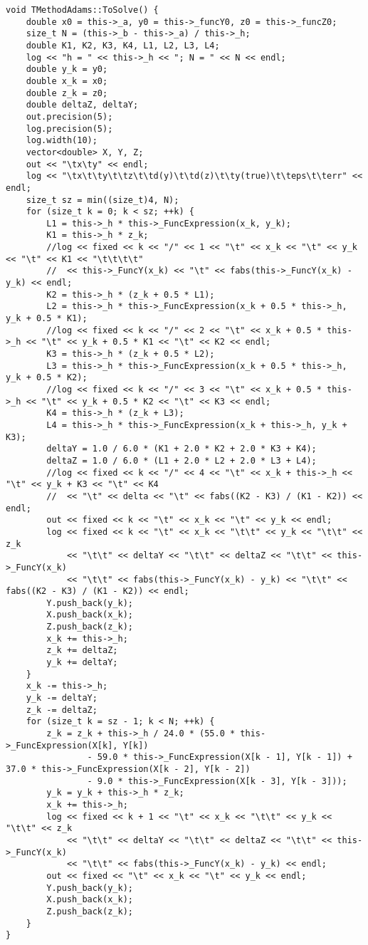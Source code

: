 \begin{lstlisting}
void TMethodAdams::ToSolve() {
	double x0 = this->_a, y0 = this->_funcY0, z0 = this->_funcZ0;
	size_t N = (this->_b - this->_a) / this->_h;
	double K1, K2, K3, K4, L1, L2, L3, L4;
	log << "h = " << this->_h << "; N = " << N << endl;
	double y_k = y0;
	double x_k = x0;
	double z_k = z0;
	double deltaZ, deltaY;
	out.precision(5);
	log.precision(5);
	log.width(10);
	vector<double> X, Y, Z;
	out << "\tx\ty" << endl;
	log << "\tx\t\ty\t\tz\t\td(y)\t\td(z)\t\ty(true)\t\teps\t\terr" << endl;
	size_t sz = min((size_t)4, N);
	for (size_t k = 0; k < sz; ++k) {
		L1 = this->_h * this->_FuncExpression(x_k, y_k);
		K1 = this->_h * z_k;		
		//log << fixed << k << "/" << 1 << "\t" << x_k << "\t" << y_k << "\t" << K1 << "\t\t\t\t" 
		//	<< this->_FuncY(x_k) << "\t" << fabs(this->_FuncY(x_k) - y_k) << endl;		
		K2 = this->_h * (z_k + 0.5 * L1);
		L2 = this->_h * this->_FuncExpression(x_k + 0.5 * this->_h, y_k + 0.5 * K1);
		//log << fixed << k << "/" << 2 << "\t" << x_k + 0.5 * this->_h << "\t" << y_k + 0.5 * K1 << "\t" << K2 << endl;
		K3 = this->_h * (z_k + 0.5 * L2);
		L3 = this->_h * this->_FuncExpression(x_k + 0.5 * this->_h, y_k + 0.5 * K2);
		//log << fixed << k << "/" << 3 << "\t" << x_k + 0.5 * this->_h << "\t" << y_k + 0.5 * K2 << "\t" << K3 << endl;
		K4 = this->_h * (z_k + L3);
		L4 = this->_h * this->_FuncExpression(x_k + this->_h, y_k + K3);
		deltaY = 1.0 / 6.0 * (K1 + 2.0 * K2 + 2.0 * K3 + K4);
		deltaZ = 1.0 / 6.0 * (L1 + 2.0 * L2 + 2.0 * L3 + L4);
		//log << fixed << k << "/" << 4 << "\t" << x_k + this->_h << "\t" << y_k + K3 << "\t" << K4 
		//	<< "\t" << delta << "\t" << fabs((K2 - K3) / (K1 - K2)) << endl;
		out << fixed << k << "\t" << x_k << "\t" << y_k << endl;
		log << fixed << k << "\t" << x_k << "\t\t" << y_k << "\t\t" << z_k 
			<< "\t\t" << deltaY << "\t\t" << deltaZ << "\t\t" << this->_FuncY(x_k) 
			<< "\t\t" << fabs(this->_FuncY(x_k) - y_k) << "\t\t" << fabs((K2 - K3) / (K1 - K2)) << endl;
		Y.push_back(y_k);
		X.push_back(x_k);
		Z.push_back(z_k);			
		x_k += this->_h;
		z_k += deltaZ;
		y_k += deltaY;		
	}		
	x_k -= this->_h;
	y_k -= deltaY;
	z_k -= deltaZ;
	for (size_t k = sz - 1; k < N; ++k) {
		z_k = z_k + this->_h / 24.0 * (55.0 * this->_FuncExpression(X[k], Y[k]) 
				- 59.0 * this->_FuncExpression(X[k - 1], Y[k - 1]) + 37.0 * this->_FuncExpression(X[k - 2], Y[k - 2]) 
				- 9.0 * this->_FuncExpression(X[k - 3], Y[k - 3]));
		y_k = y_k + this->_h * z_k;
		x_k += this->_h;
		log << fixed << k + 1 << "\t" << x_k << "\t\t" << y_k << "\t\t" << z_k 
			<< "\t\t" << deltaY << "\t\t" << deltaZ << "\t\t" << this->_FuncY(x_k) 
			<< "\t\t" << fabs(this->_FuncY(x_k) - y_k) << endl;
		out << fixed << "\t" << x_k << "\t" << y_k << endl;			
		Y.push_back(y_k);
		X.push_back(x_k);
		Z.push_back(z_k);
	}	
}


\end{lstlisting}
